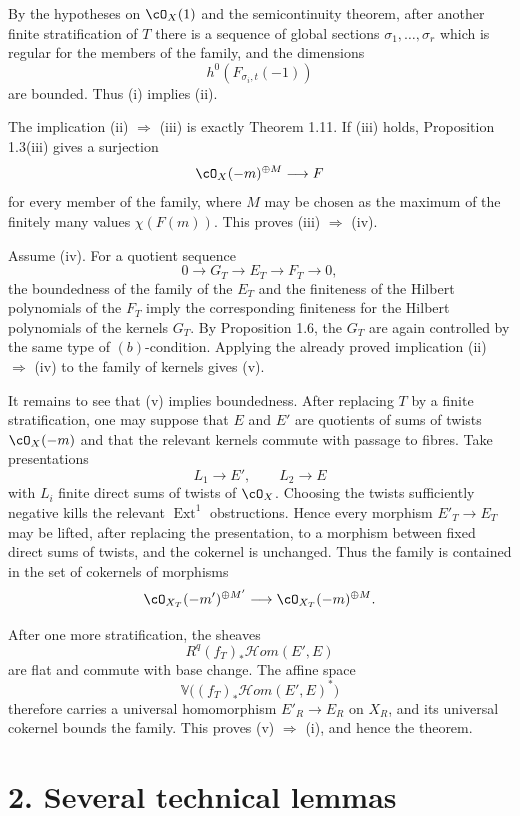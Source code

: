\documentclass[11pt]{article}
\theoremstyle{plain}
\theoremstyle{definition}
\theoremstyle{remark}
\newcommand{\longto}{\longrightarrow}
\begin{document}
By the hypotheses on $\cO_X(1)$ and the semicontinuity theorem, after another finite stratification of $T$ there is a sequence of global sections $\sigma_1,\ldots,\sigma_r$ which is regular for the members of the family, and the dimensions
\[
h^0(F_{\sigma_i,t}(-1))
\]
are bounded. Thus (i) implies (ii).

The implication (ii) $\Rightarrow$ (iii) is exactly Theorem 1.11. If (iii) holds, Proposition 1.3(iii) gives a surjection
\[
\cO_X(-m)^{\oplus M}\longto F
\]
for every member of the family, where $M$ may be chosen as the maximum of the finitely many values $\chi(F(m))$. This proves (iii) $\Rightarrow$ (iv).

Assume (iv). For a quotient sequence
\[
0\to G_T\to E_T\to F_T\to0,
\]
the boundedness of the family of the $E_T$ and the finiteness of the Hilbert polynomials of the $F_T$ imply the corresponding finiteness for the Hilbert polynomials of the kernels $G_T$. By Proposition 1.6, the $G_T$ are again controlled by the same type of $(b)$-condition. Applying the already proved implication (ii) $\Rightarrow$ (iv) to the family of kernels gives (v).

It remains to see that (v) implies boundedness. After replacing $T$ by a finite stratification, one may suppose that $E$ and $E'$ are quotients of sums of twists $\cO_X(-m)$ and that the relevant kernels commute with passage to fibres. Take presentations
\[
L_1\longto E',\qquad L_2\longto E
\]
with $L_i$ finite direct sums of twists of $\cO_X$. Choosing the twists sufficiently negative kills the relevant $\operatorname{Ext}^1$ obstructions. Hence every morphism $E'_T\to E_T$ may be lifted, after replacing the presentation, to a morphism between fixed direct sums of twists, and the cokernel is unchanged. Thus the family is contained in the set of cokernels of morphisms
\[
\cO_{X_T}(-m')^{\oplus M'}\longto \cO_{X_T}(-m)^{\oplus M}.
\]

After one more stratification, the sheaves
\[
R^q(f_T)_*\mathcal Hom(E',E)
\]
are flat and commute with base change. The affine space
\[
\mathbb V\bigl((f_T)_*\mathcal Hom(E',E)^*\bigr)
\]
therefore carries a universal homomorphism $E'_R\to E_R$ on $X_R$, and its universal cokernel bounds the family. This proves (v) $\Rightarrow$ (i), and hence the theorem.

\section*{2. Several technical lemmas}
\end{document}
